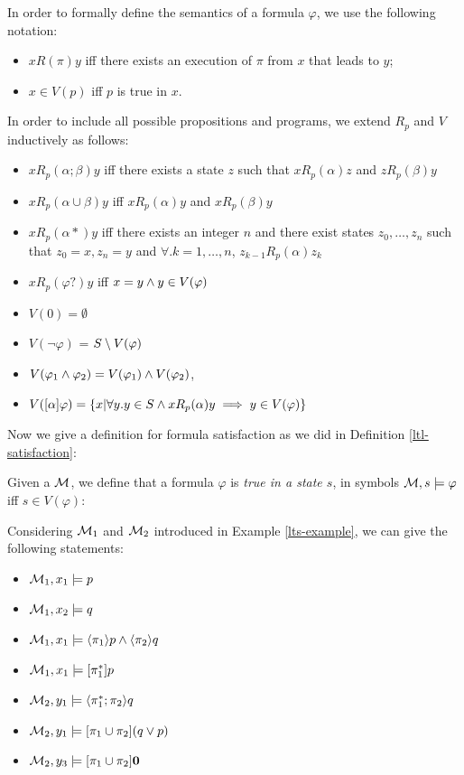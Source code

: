 In order to formally define the semantics of a \PDL formula $\varphi$, we use the following notation: 
\begin{itemize}
	\item $x R(\pi) y$ iff there exists an execution of $\pi$ from $x$ that leads to $y$;
	\item $x \in V(p)$ iff $p$ is true in $x$.
\end{itemize}
In order to include all possible propositions and programs, we extend $R_p$ and $V$ inductively as follows:
\begin{itemize}
	\item $xR_p(\alpha;\beta)y$ iff there exists a state $z$ such that 	$xR_p(\alpha)z$ and $zR_p(\beta)y$
	\item $	xR_p(\alpha \cup \beta)y$ iff $xR_p(\alpha)y$ and $xR_p(\beta)y$
	\item $	xR_p(\alpha*)y$ iff there exists an integer $n$ and there exist states $z_0,\dots, z_n$ such that $z_0=x, z_n=y$ and $\forall.k= 1, \dots, n$,  $z_{k-1}R_p(\alpha)z_k$
	\item $	xR_p(\varphi?)y$ iff $x = y \wedge y \in V(\varphi)$
	\item $V(0) = \emptyset $
	\item $V(\lnot \varphi)$ = $S \setminus V(\varphi)$
	\item $	V(\varphi_1 \wedge \varphi_2) = V(\varphi_1) \wedge V(\varphi_2)$,
	\item $	V([\alpha]\varphi) = \{x| \forall y.y \in S \wedge xR_p(\alpha)y \implies y \in V(\varphi)\}$
\end{itemize}
Now we give a definition for \PDL formula satisfaction as we did in Definition \ref{ltl-satisfaction}:

\begin{definition}
	Given a \LTS $\mathcal{M}$, we define that a \PDL formula $\varphi$ is \emph{true in a state $s$}, in symbols $\mathcal{M}, s \models \varphi$ iff $s\in V(\varphi)$:
\end{definition}

\begin{example}
	Considering $\mathcal{M}_1$ and $\mathcal{M}_2$ introduced in Example \ref{lts-example}, we can give the following statements:
	\begin{itemize}
		\item $\mathcal{M}_1, x_1 \models p$
		\item $\mathcal{M}_1, x_2 \models q$
		\item $\mathcal{M}_1, x_1 \models \langle \pi_1 \rangle p \wedge \langle \pi_2 \rangle q$
		\item $\mathcal{M}_1, x_1 \models [\pi_1^*]p$
		\item $\mathcal{M}_2, y_1 \models \langle \pi_1^*; \pi_2 \rangle q$
		\item $\mathcal{M}_2, y_1 \models [\pi_1 \cup \pi_2](q\vee p)$
		\item $\mathcal{M}_2, y_3 \models [\pi_1 \cup \pi_2]\mathbf{0}$
	\end{itemize}
\end{example}

